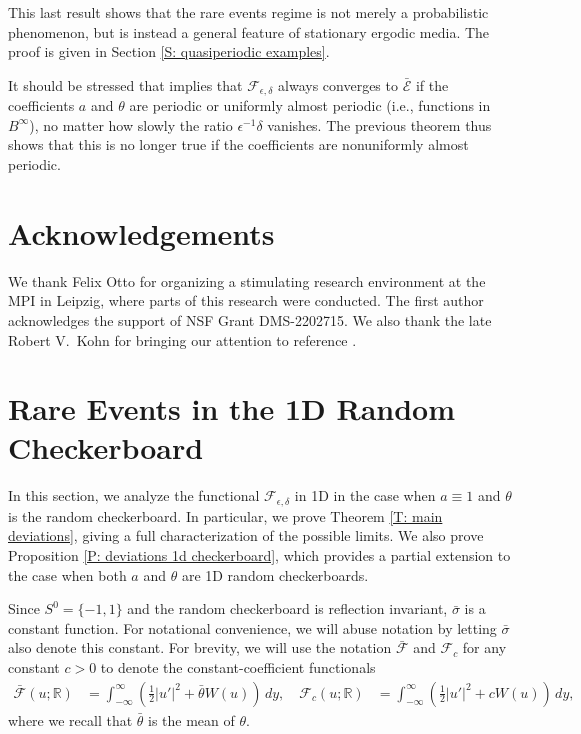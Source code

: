 \documentclass[12pt]{amsart}
\begin{document}
This last result shows that the rare events regime is not merely a probabilistic phenomenon, but is instead a general feature of stationary ergodic media.  The proof is given in Section \ref{S: quasiperiodic examples}.

It should be stressed that \cite[Corollary 2]{part1} implies that $\mathscr{F}_{\epsilon,\delta}$ always converges to $\bar{\mathscr{E}}$ if the coefficients $a$ and $\theta$ are periodic or uniformly almost periodic (i.e., functions in $B^{\infty}$), no matter how slowly the ratio $\epsilon^{-1} \delta$ vanishes.  The previous theorem thus shows that this is no longer true if the coefficients are nonuniformly almost periodic.



\section*{Acknowledgements}  

We thank Felix Otto for organizing a stimulating research environment at the MPI in Leipzig, where parts of this research were conducted. The first author acknowledges the support of NSF Grant DMS-2202715.  We also thank the late Robert V.\ Kohn for bringing our attention to reference \cite{vanden-eijnden_westdickenberg}.

\tableofcontents




\section{Rare Events in the 1D Random Checkerboard} \label{S: heuristics}

In this section, we analyze the functional $\mathscr{F}_{\epsilon,\delta}$ in 1D in the case when $a \equiv 1$ and $\theta$ is the random checkerboard.  In particular, we prove Theorem \ref{T: main deviations}, giving a full characterization of the possible limits.  We also prove Proposition \ref{P: deviations 1d checkerboard}, which provides a partial extension to the case when both $a$ and $\theta$ are 1D random checkerboards.

Since $S^{0} = \{-1,1\}$ and the random checkerboard is reflection invariant, $\bar{\sigma}$ is a constant function.  For notational convenience, we will abuse notation by letting $\bar{\sigma}$ also denote this constant. For brevity, we will use the notation $\bar{\mathscr{F}}$ and $\mathscr{F}_{c}$ for any constant $c > 0$ to denote the constant-coefficient functionals
    \begin{align*}
        \bar{\mathscr{F}}(u; \mathbb{R}) &= \int_{-\infty}^{\infty} \left( \frac{1}{2} |u'|^{2} + \bar{\theta} W(u) \right) \, dy, \quad \mathscr{F}_{c}(u;\mathbb{R}) &= \int_{-\infty}^{\infty} \left( \frac{1}{2} |u'|^{2} + c W(u) \right) \, dy,
    \end{align*}
where we recall that $\bar{\theta}$ is the mean of $\theta$.
\end{document}
